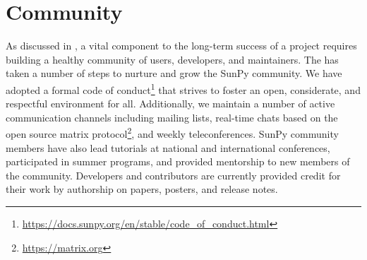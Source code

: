 \section{Community}
\label{sec:community}

As discussed in \citet{bangerth2013}, a vital component to the long-term success of a project requires building a healthy community of users, developers, and maintainers.
The \sunpyproj has taken a number of steps to nurture and grow the SunPy community.
We have adopted a formal code of conduct\footnote{\url{https://docs.sunpy.org/en/stable/code_of_conduct.html}} that strives to foster an open, considerate, and respectful environment for all.
Additionally, we maintain a number of active communication channels including mailing lists, real-time chats based on the open source matrix protocol\footnote{\url{https://matrix.org}}, and weekly teleconferences.
SunPy community members have also lead tutorials at national and international conferences, participated in summer programs, and provided mentorship to new members of the community.
Developers and contributors are currently provided credit for their work by authorship on papers, posters, and release notes.
